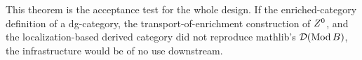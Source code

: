 \begin{remark}
This theorem is the acceptance test for the whole design. If the enriched-category
definition of a dg-category, the transport-of-enrichment construction of $Z^0$, and the
localization-based derived category did not reproduce mathlib's $\mathcal{D}(\operatorname{Mod} B)$, the
infrastructure would be of no use downstream.
\end{remark}
